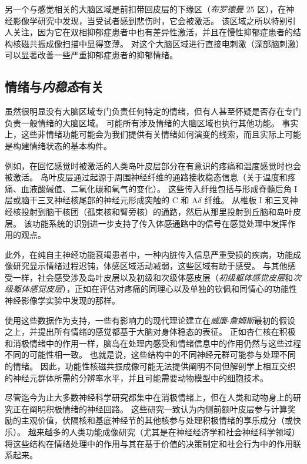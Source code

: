 另一个与感觉相关的大脑区域是前扣带回皮层的下缘区（\textit{布罗德曼} 25 区），在神经影像学研究中发现，当受试者感到悲伤时，它会被激活。
该区域之所以特别引人关注，因为它在双相抑郁症患者中也有差异性激活，并且在慢性抑郁症患者的结构核磁共振成像扫描中显得变薄。
对这个大脑区域进行直接电刺激（深部脑刺激）可以显著改善一些严重抑郁症患者的抑郁情绪。



\subsection{情绪与\textit{内稳态}有关}

虽然很明显没有大脑区域专门负责任何特定的情绪，但有人甚至怀疑是否存在专门负责一般情绪的大脑区域。
可能所有涉及情绪的大脑区域也执行其他功能。
事实上，这些非情绪功能可能会为我们提供有关情绪如何演变的线索，而且实际上可能是构建情绪状态的基本构件。


例如，在回忆感觉时被激活的人类岛叶皮层部分在有意识的疼痛和温度感觉时也会被激活。
岛叶皮层通过起源于周围神经纤维的通路接收稳态信息（关于温度和疼痛、血液酸碱值、二氧化碳和氧气的变化）。
这些传入纤维包括与形成脊髓后角 I 层或脑干三叉神经核尾部的神经元形成突触的 C 和 A$ \delta $ 纤维。
从椎板 I 和三叉神经核投射到脑干核团（孤束核和臂旁核）的通路，然后从那里投射到丘脑和岛叶皮层。
该功能系统的识别进一步支持了传入体感通路中的信号在感觉处理中发挥作用的观点。


此外，在纯自主神经功能衰竭患者中，一种内脏传入信息严重受损的疾病，功能成像研究显示情绪过程迟钝，体感区域活动减弱，这些区域有助于感受。
与其他感受一样，社会感受涉及岛叶皮层以及初级和次级体感皮层（\textit{初级躯体感觉皮层}和\textit{次级躯体感觉皮层}），正如在评估对疼痛的同理心以及单独的钦佩和同情心的功能性神经影像学实验中发现的那样。


使用这些数据作为支持，一些有影响力的现代理论建立在\textit{威廉$\cdot$詹姆斯}最初的假设之上，并提出所有情绪的感觉都基于大脑对身体稳态的表征。
正如杏仁核在积极和消极情绪中的作用一样，脑岛在处理内感受和情绪信息中的作用仍然与这些过程不同的可能性相一致。
也就是说，这些结构中的不同神经元群可能参与处理不同的情绪。
因此，功能性核磁共振成像可能无法提供阐明不同但解剖学上相互交织的神经元群体所需的分辨率水平，并且可能需要动物模型中的细胞技术。


尽管迄今为止大多数神经科学研究都集中在消极情绪上，但在人类和动物身上的研究正在阐明积极情绪的神经回路。
这些研究一致认为内侧前额叶皮层参与计算奖励的主观价值，伏隔核和基底神经节的其他核参与处理积极情绪的享乐成分（或快乐）。
越来越多的人类功能成像研究（尤其是在神经经济学和社会神经科学领域）将这些结构在情绪处理中的作用与其在基于价值的决策制定和社会行为中的作用联系起来。




